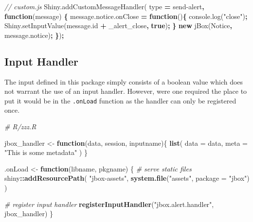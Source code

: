 \documentclass[
]{krantz}
\makeatletter
\newenvironment{Shaded}{\begin{snugshade}}{\end{snugshade}}
\newcommand{\AttributeTok}[1]{\textcolor[rgb]{0.61,0.61,0.61}{#1}}
\newcommand{\CommentTok}[1]{\textcolor[rgb]{0.37,0.37,0.37}{\textit{#1}}}
\newcommand{\ControlFlowTok}[1]{\textcolor[rgb]{0.27,0.27,0.27}{\textbf{#1}}}
\newcommand{\DataTypeTok}[1]{\textcolor[rgb]{0.27,0.27,0.27}{#1}}
\newcommand{\KeywordTok}[1]{\textcolor[rgb]{0.27,0.27,0.27}{\textbf{#1}}}
\newcommand{\NormalTok}[1]{#1}
\newcommand{\OperatorTok}[1]{\textcolor[rgb]{0.43,0.43,0.43}{\textbf{#1}}}
\newcommand{\StringTok}[1]{\textcolor[rgb]{0.5,0.5,0.5}{#1}}
\newcommand{\VariableTok}[1]{\textcolor[rgb]{0,0,0}{#1}}
\newenvironment{kframe}{%
\medskip{}
\setlength{\fboxsep}{.8em}
 \def\at@end@of@kframe{}%
 \ifinner\ifhmode%
  \def\at@end@of@kframe{\end{minipage}}%
  \begin{minipage}{\columnwidth}%
 \fi\fi%
 \def\FrameCommand##1{\hskip\@totalleftmargin \hskip-\fboxsep
 \colorbox{shadecolor}{##1}\hskip-\fboxsep
     \hskip-\linewidth \hskip-\@totalleftmargin \hskip\columnwidth}%
 \MakeFramed {\advance\hsize-\width
   \@totalleftmargin\z@ \linewidth\hsize
   \@setminipage}}%
 {\par\unskip\endMakeFramed%
 \at@end@of@kframe}
\renewenvironment{Shaded}{\begin{kframe}}{\end{kframe}}
\makeatother
\begin{document}
\begin{Shaded}
\begin{Highlighting}[]
\CommentTok{// custom.js}
\VariableTok{Shiny}\NormalTok{.}\AttributeTok{addCustomMessageHandler}\NormalTok{(}
\NormalTok{  type }\OperatorTok{=} \StringTok{\textquotesingle{}send{-}alert\textquotesingle{}}\OperatorTok{,} \KeywordTok{function}\NormalTok{(message) }\OperatorTok{\{}
    \VariableTok{message}\NormalTok{.}\VariableTok{notice}\NormalTok{.}\AttributeTok{onClose} \OperatorTok{=} \KeywordTok{function}\NormalTok{()}\OperatorTok{\{}
      \VariableTok{console}\NormalTok{.}\AttributeTok{log}\NormalTok{(}\StringTok{"close"}\NormalTok{)}\OperatorTok{;}
      \VariableTok{Shiny}\NormalTok{.}\AttributeTok{setInputValue}\NormalTok{(}\VariableTok{message}\NormalTok{.}\AttributeTok{id} \OperatorTok{+} \StringTok{\textquotesingle{}\_alert\_close\textquotesingle{}}\OperatorTok{,} \KeywordTok{true}\NormalTok{)}\OperatorTok{;}
    \OperatorTok{\}}
    \KeywordTok{new} \AttributeTok{jBox}\NormalTok{(}\StringTok{\textquotesingle{}Notice\textquotesingle{}}\OperatorTok{,} \VariableTok{message}\NormalTok{.}\AttributeTok{notice}\NormalTok{)}\OperatorTok{;}
\OperatorTok{\}}\NormalTok{)}\OperatorTok{;}
\end{Highlighting}
\end{Shaded}

\hypertarget{shiny-complete-pkg-input}{%
\subsection{Input Handler}\label{shiny-complete-pkg-input}}

The input defined in this package simply consists of a boolean value which does not warrant the use of an input handler. However, were one required the place to put it would be in the \texttt{.onLoad} function as the handler can only be registered once.

\begin{Shaded}
\begin{Highlighting}[]
\CommentTok{\# R/zzz.R}

\NormalTok{jbox\_handler <{-}}\StringTok{ }\ControlFlowTok{function}\NormalTok{(data, session, inputname)\{}
  \KeywordTok{list}\NormalTok{(}
    \DataTypeTok{data =}\NormalTok{ data,}
    \DataTypeTok{meta =} \StringTok{"This is some metadata"}
\NormalTok{  )}
\NormalTok{\}}

\NormalTok{.onLoad <{-}}\StringTok{ }\ControlFlowTok{function}\NormalTok{(libname, pkgname) \{}
  \CommentTok{\# serve static files}
\NormalTok{  shiny}\OperatorTok{::}\KeywordTok{addResourcePath}\NormalTok{(}
    \StringTok{"jbox{-}assets"}\NormalTok{,}
    \KeywordTok{system.file}\NormalTok{(}\StringTok{"assets"}\NormalTok{, }\DataTypeTok{package =} \StringTok{"jbox"}\NormalTok{)}
\NormalTok{  )}

  \CommentTok{\# register input handler}
  \KeywordTok{registerInputHandler}\NormalTok{(}\StringTok{"jbox.alert.handler"}\NormalTok{, jbox\_handler)}
\NormalTok{\}}
\end{Highlighting}
\end{Shaded}
\end{document}
